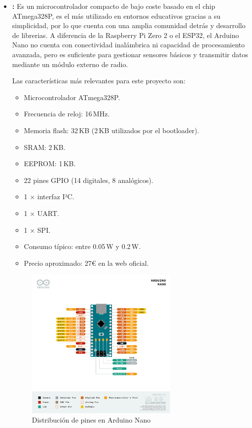 \begin{itemize}
    \item \textbf{\cite{arduino_nano}:}
    Es un microcontrolador compacto de bajo coste basado en el chip ATmega328P, es el más utilizado en entornos educativos gracias a su simplicidad,
    por lo que cuenta con una amplia comunidad detrás y desarrollo de librerias.
    A diferencia de la Raspberry Pi Zero 2 o el ESP32, el Arduino Nano no cuenta con conectividad inalámbrica ni capacidad de procesamiento avanzada,
    pero es suficiente para gestionar sensores básicos y transmitir datos mediante un módulo externo de radio.

    Las características más relevantes para este proyecto son:
    \begin{itemize}
        \item Microcontrolador ATmega328P.
        \item Frecuencia de reloj: 16\,MHz.
        \item Memoria flash: 32\,KB (2\,KB utilizados por el bootloader).
        \item SRAM: 2\,KB.
        \item EEPROM: 1\,KB.
        \item 22 pines GPIO (14 digitales, 8 analógicos).
        \item 1 × interfaz I²C.
        \item 1 × UART.
        \item 1 × SPI.
        \item Consumo típico: entre 0.05\,W y 0.2\,W.
        \item Precio aproximado: 27€ en la web oficial.
    \end{itemize}

    \begin{figure}[h]
        \centering
        \includegraphics[width=0.7\textwidth]{Imagenes/Bitmap/arduinoNanogpio}
        \caption{Distribución de pines en Arduino Nano}
        \label{fig:arduino_nano_gpio}
    \end{figure}


\end{itemize}
